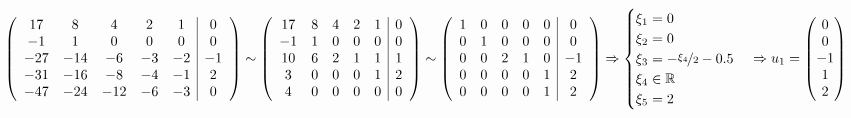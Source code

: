 \documentclass{article}
\begin{document}
$$\left(\begin{array}{ccccc|c}
17 & 8 & 4 & 2 & 1 & 0\\
-1 & 1 & 0 & 0 & 0 & 0\\
-27 & -14 & -6 & -3 & -2 & -1 \\
-31 & -16 & -8 & -4 & -1 & 2\\
-47 & -24 & -12 & -6 & -3 & 0
\end{array}\right) \sim \left(\begin{array}{ccccc|c}
17 & 8 & 4 & 2 & 1 & 0\\
-1 & 1 & 0 & 0 & 0 & 0\\
10 & 6 & 2 & 1 & 1 & 1 \\
3 & 0 & 0 & 0 & 1 & 2\\
4 & 0 & 0 & 0 & 0 & 0
\end{array}\right) \sim \left(\begin{array}{ccccc|c}
1 & 0 & 0 & 0 & 0 & 0\\
0 & 1 & 0 & 0 & 0 & 0\\
0 & 0 & 2 & 1 & 0 & -1\\
0 & 0 & 0 & 0 & 1 & 2 \\
0 & 0 & 0 & 0 & 1 & 2\\
\end{array}\right) \Rightarrow \begin{cases}
\xi_1 = 0 \\ \xi_2 = 0 \\ \xi_3 = -\nicefrac{\xi_4}{2} - 0.5 \\ \xi_4 \in \mathbb{R} \\ \xi_5 = 2
\end{cases} \Rightarrow u_1 = \begin{pmatrix}
0 \\ 0 \\ -1 \\ 1 \\ 2
\end{pmatrix}$$
\end{document}
